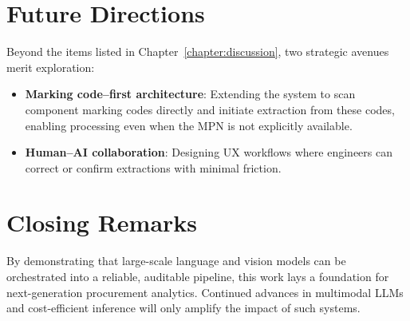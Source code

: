 \section{Future Directions}
Beyond the items listed in Chapter~\ref{chapter:discussion}, two strategic avenues merit exploration:
\begin{itemize}
  \item \textbf{Marking code–first architecture}: Extending the system to scan component marking codes directly and initiate extraction from these codes, enabling processing even when the MPN is not explicitly available.
  \item \textbf{Human–AI collaboration}: Designing UX workflows where engineers can correct or confirm extractions with minimal friction.
\end{itemize}

\section{Closing Remarks}
By demonstrating that large-scale language and vision models can be orchestrated into a reliable, auditable pipeline, this work lays a foundation for next-generation procurement analytics.  Continued advances in multimodal LLMs and cost-efficient inference will only amplify the impact of such systems.